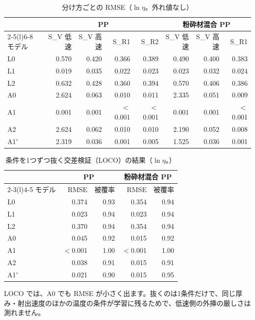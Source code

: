 \documentclass[paper=a4paper,fontsize=10.5pt,line_length=44zw,number_of_lines=38]{jlreq}
\newcommand{\file}[1]{\texttt{\detokenize{#1}}}
\begin{document}
\begin{table}[H]
\caption{分け方ごとの RMSE（$\ln\eta$。外れ値なし）}
\begin{tabularx}{\linewidth}{@{}X*{7}{r}@{}}
\toprule
 & \multicolumn{4}{c}{PP} & \multicolumn{3}{c}{粉砕材混合 PP} \\
\cmidrule(lr){2-5}\cmidrule(l){6-8}
モデル & S\_V 低速 & S\_V 高速 & S\_R1 & S\_R2 & S\_V 低速 & S\_V 高速 & S\_R1 \\
\midrule
L0 & 0.570 & 0.420 & 0.366 & 0.389 & 0.490 & 0.400 & 0.383 \\
L1 & 0.019 & 0.035 & 0.022 & 0.023 & 0.023 & 0.032 & 0.024 \\
L2 & 0.632 & 0.428 & 0.360 & 0.394 & 0.570 & 0.406 & 0.386 \\
A0 & 2.624 & 0.063 & 0.010 & 0.011 & 2.335 & 0.051 & 0.009 \\
A1 & 0.001 & 0.001 & $<$0.001 & $<$0.001 & 0.001 & 0.001 & $<$0.001 \\
A2 & 2.624 & 0.062 & 0.010 & 0.010 & 2.190 & 0.052 & 0.008 \\
A1$'$ & 2.319 & 0.036 & 0.001 & 0.005 & 1.525 & 0.036 & 0.001 \\
\bottomrule
\end{tabularx}
\end{table}

\begin{table}[H]
\caption{条件を1つずつ抜く交差検証（LOCO）の結果（$\ln\eta$。\file{loco_metrics.csv}）}
\begin{tabularx}{\linewidth}{@{}X*{4}{r}@{}}
\toprule
 & \multicolumn{2}{c}{PP} & \multicolumn{2}{c}{粉砕材混合 PP} \\
\cmidrule(lr){2-3}\cmidrule(l){4-5}
モデル & RMSE & 被覆率 & RMSE & 被覆率 \\
\midrule
L0 & 0.374 & 0.93 & 0.354 & 0.94 \\
L1 & 0.023 & 0.94 & 0.023 & 0.94 \\
L2 & 0.370 & 0.94 & 0.354 & 0.94 \\
A0 & 0.045 & 0.92 & 0.015 & 0.92 \\
A1 & $<$0.001 & 1.00 & $<$0.001 & 1.00 \\
A2 & 0.038 & 0.91 & 0.015 & 0.91 \\
A1$'$ & 0.021 & 0.90 & 0.015 & 0.95 \\
\bottomrule
\end{tabularx}
\end{table}

LOCO では、A0 でも RMSE が小さく出ます。抜くのは1条件だけで、同じ厚み・射出速度のほかの温度の条件が学習に残るためで、低速側の外挿の厳しさは測れません。
\end{document}
